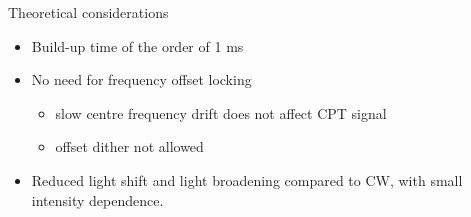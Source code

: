 \begin{block}{Theoretical considerations}
  \begin{itemize}
  \item Build-up time of the order of 1 ms
  \item No need for frequency offset locking
    \begin{itemize}
    \item slow centre frequency drift does not affect CPT signal
    \item offset dither not allowed
    \end{itemize}
  \item Reduced light shift and light broadening compared to CW, with small intensity dependence.
  \end{itemize}
  \begin{columns}
    \begin{column}{0.49\textwidth}
      \begin{figure}
        \begin{center}
          \setlength\fboxsep{0pt}
          \setlength\fboxrule{0.5pt}
        \end{center}
      \end{figure}
    \end{column}
    \begin{column}{0.49\textwidth}
      \begin{figure}
        \begin{center}
          \setlength\fboxsep{0pt}
          \setlength\fboxrule{0.5pt}

\end{center}
\end{figure}
\end{column}
\end{columns}
\end{block}
